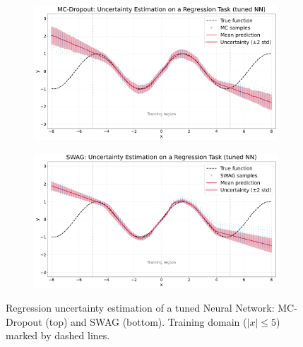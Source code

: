 \begin{figure}[ht]
  \centering
  \begin{subfigure}{0.8\textwidth}
    \centering
    \includegraphics[width=\textwidth]{plots/mcd_reg_tuned.png}
  \end{subfigure}
  
  \vspace{0.3cm}
  \begin{subfigure}{0.8\textwidth}
    \centering
    \includegraphics[width=\textwidth]{plots/swag_reg_tuned.png}
  \end{subfigure}
  \caption{Regression uncertainty estimation of a tuned Neural Network: MC-Dropout (top) and SWAG (bottom). Training domain ($|x| \leq 5$) marked by dashed lines.}
  \label{fig:regression_tuned}
\end{figure}

